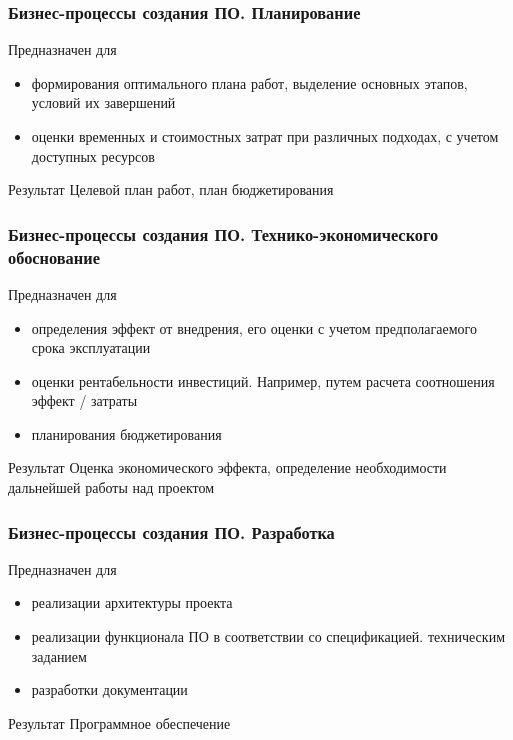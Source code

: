 \documentclass{../industrial-development}
\begin{document}
\begin{frame} \frametitle{Бизнес-процессы создания ПО. Планирование}
	\begin{block}{Предназначен для}
		\begin{itemize}
			\item формирования оптимального плана работ, выделение основных этапов, условий их завершений
			\item оценки временных и стоимостных затрат при различных подходах, с учетом доступных ресурсов
		\end{itemize}
	\end{block}
	\begin{block}{Результат}
		Целевой план работ, план бюджетирования
	\end{block}
\end{frame}
\lecturenotes


\begin{frame} \frametitle{Бизнес-процессы создания ПО. Технико-экономического обоснование}
	\begin{block}{Предназначен для}
		\begin{itemize}
			\item определения эффект от внедрения, его оценки с учетом предполагаемого срока эксплуатации
			\item оценки рентабельности инвестиций. Например, путем расчета соотношения эффект / затраты
			\item планирования бюджетирования
		\end{itemize}
	\end{block}
	\begin{block}{Результат}
		Оценка экономического эффекта, определение необходимости дальнейшей работы над проектом
	\end{block}
\end{frame}
\lecturenotes


\begin{frame} \frametitle{Бизнес-процессы создания ПО. Разработка}
	\begin{block}{Предназначен для}
		\begin{itemize}
			\item реализации архитектуры проекта
			\item реализации функционала ПО в соответствии со спецификацией. техническим заданием
			\item разработки документации
		\end{itemize}
	\end{block}
	\begin{block}{Результат}
		Программное обеспечение
	\end{block}
\end{frame}
\lecturenotes
\end{document}
